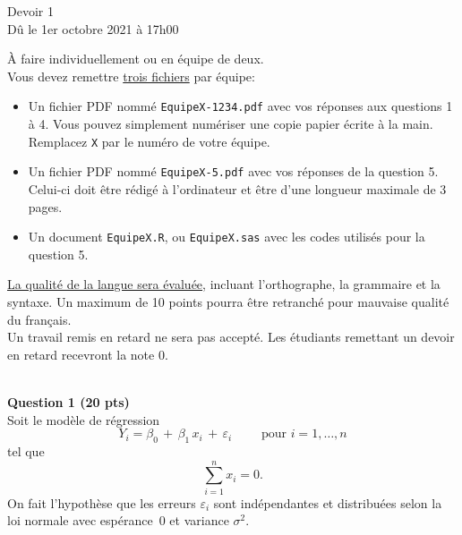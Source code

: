 \documentclass[letter, 11pt]{article}
\begin{document}
\vspace*{0.05 in}
\begin{center}
{\Large Devoir 1 \\
Dû le 1er octobre 2021 à 17h00}
\end{center}
\vspace*{0.1 in}


À faire individuellement ou en équipe de deux. \\

Vous devez remettre \underline{trois fichiers} par équipe:
\begin{itemize}
\item Un fichier PDF nommé {\tt EquipeX-1234.pdf} avec vos réponses aux questions 1 à 4. Vous pouvez simplement numériser une copie papier écrite à la main. Remplacez {\tt X} par le numéro de votre équipe.
\item Un fichier PDF nommé {\tt EquipeX-5.pdf} avec vos réponses de la question 5. Celui-ci doit être rédigé à l'ordinateur et être d'une longueur maximale de 3 pages. %
\item Un document {\tt EquipeX.R}, ou {\tt EquipeX.sas} avec les codes utilisés pour la question 5.\\
\end{itemize}


\underline{La qualité de la langue sera évaluée}, incluant l'orthographe, la grammaire et la syntaxe. Un maximum de 10 points pourra être retranché pour mauvaise qualité du français. \\

Un travail remis en retard ne sera pas accepté. Les étudiants remettant un devoir en retard recevront la note 0.

\vspace{0.5cm}

\underline{\hspace{17cm}}\\

\textbf{Question 1 (20 pts)} \\

Soit le modèle de régression
$$
Y_i = \beta_0\,+\,\beta_1\, x_i \,+\, \varepsilon_i\qquad \text{ pour } i=1,\ldots,n
$$
tel que 
$$ \sum_{i = 1}^n x_i = 0.$$
On fait l'hypothèse que les erreurs $\varepsilon_i$ sont indépendantes et distribuées selon la loi normale avec espérance~0 et variance $\sigma^2$. 
\end{document}
